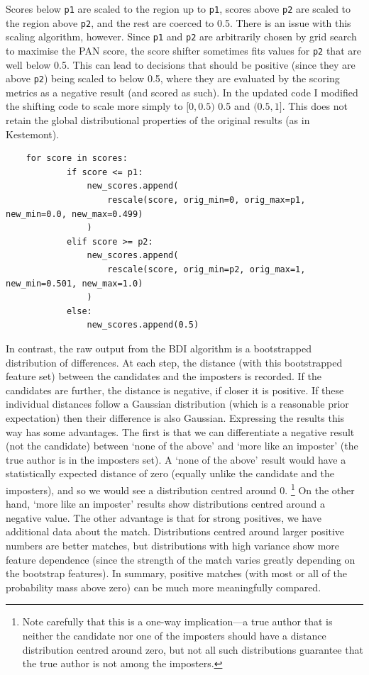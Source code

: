 \documentclass[
    hf,
]{ceurart}
\begin{document}
\cite{stover_kestemont_2016}
Scores below \texttt{p1} are scaled to the region up to
\texttt{p1}, scores above \texttt{p2} are scaled to the
region above \texttt{p2}, and the rest are coerced to 0.5. There is
an issue with this scaling algorithm, however. Since \texttt{p1} and
\texttt{p2} are arbitrarily chosen by grid search to maximise the
PAN score, the score shifter sometimes fits values for \texttt{p2}
that are well below 0.5. This can lead to decisions that should be positive
(since they are above \texttt{p2}) being scaled to below 0.5, where
they are evaluated by the scoring metrics as a negative result (and scored as
such). In the updated code I modified the shifting code to scale more simply to
$[0,0.5)$ 0.5 and $(0.5,1]$. This does not retain the global distributional
properties of the original results (as in Kestemont).

\begin{verbatim}
    for score in scores:
            if score <= p1:
                new_scores.append(
                    rescale(score, orig_min=0, orig_max=p1, new_min=0.0, new_max=0.499)
                )
            elif score >= p2:
                new_scores.append(
                    rescale(score, orig_min=p2, orig_max=1, new_min=0.501, new_max=1.0)
                )
            else:
                new_scores.append(0.5)
\end{verbatim}

In contrast, the raw output from the BDI algorithm is a bootstrapped
distribution of differences. At each step, the distance (with this bootstrapped
feature set) between the candidates and the imposters is recorded. If the
candidates are further, the distance is negative, if closer it is positive. If
these individual distances follow a Gaussian distribution (which is a reasonable
prior expectation) then their difference is also Gaussian. Expressing the
results this way has some advantages. The first is that we can differentiate a
negative result (not the candidate) between `none of the above' and `more like
an imposter' (the true author is in the imposters set). A `none of the above'
result would have a statistically expected distance of zero (equally unlike the
candidate and the imposters), and so we would see a distribution centred around
0.%
%
\footnote{ Note carefully that this is a one-way implication---a true author
    that is neither the candidate nor one of the imposters should have a
    distance distribution centred around zero, but not all such distributions
    guarantee that the true author is not among the imposters.}
%
On the other hand, `more like an imposter' results show distributions centred
around a negative value. The other advantage is that for strong positives, we
have additional data about the match. Distributions centred around larger
positive numbers are better matches, but distributions with high variance show
more feature dependence (since the strength of the match varies greatly
depending on the bootstrap features). In summary, positive matches (with most or
all of the probability mass above zero) can be much more meaningfully compared.
\end{document}
